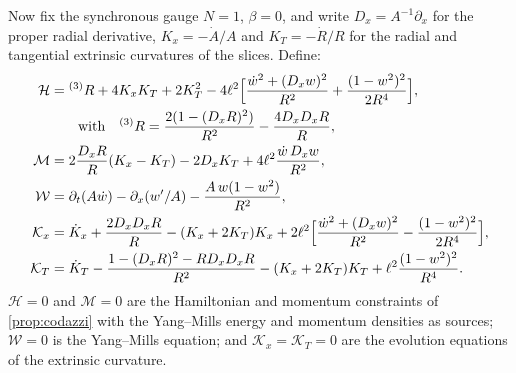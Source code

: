 Now fix the synchronous gauge $N=1$, $\beta=0$, and write $D_x=A^{-1}\partial_x$ for the proper radial derivative, $K_x=-\dot A/A$ and $K_T=-\dot R/R$ for the radial and tangential extrinsic curvatures of the slices. Define:
\begin{align*}
\mathcal H&={}^{(3)}R+4K_xK_T+2K_T^2-4\ell^2\Bigl[\frac{\dot w^2+(D_xw)^2}{R^2}+\frac{(1-w^2)^2}{2R^4}\Bigr],\\
&\qquad\text{with}\quad {}^{(3)}R=\frac{2(1-(D_xR)^2)}{R^2}-\frac{4D_xD_xR}{R},\\
\mathcal M&=2\frac{D_xR}{R}(K_x-K_T)-2D_xK_T+4\ell^2\frac{\dot w\,D_xw}{R^2},\\
\mathcal W&=\partial_t(A\dot w)-\partial_x(w'/A)-\frac{A\,w(1-w^2)}{R^2},\\
\mathcal K_x&=\dot K_x+\frac{2D_xD_xR}{R}-(K_x+2K_T)K_x+2\ell^2\Bigl[\frac{\dot w^2+(D_xw)^2}{R^2}-\frac{(1-w^2)^2}{2R^4}\Bigr],\\
\mathcal K_T&=\dot K_T-\frac{1-(D_xR)^2-RD_xD_xR}{R^2}-(K_x+2K_T)K_T+\ell^2\frac{(1-w^2)^2}{R^4}.
\end{align*}
$\mathcal H=0$ and $\mathcal M=0$ are the Hamiltonian and momentum constraints of \cref{prop:codazzi} with the Yang--Mills energy and momentum densities as sources; $\mathcal W=0$ is the Yang--Mills equation; and $\mathcal K_x=\mathcal K_T=0$ are the evolution equations of the extrinsic curvature.

